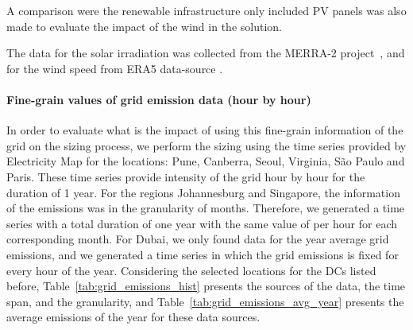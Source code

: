 A comparison were the renewable infrastructure only included PV panels was also made to evaluate the impact of the wind in the solution.

The data for the solar irradiation was collected from the MERRA-2 project~\cite{GELARO2017MERRA2}, and for the wind speed from ERA5 data-source \cite{era5_wind_2022}.

\paragraph{Fine-grain values of grid emission data (hour by hour)}


In order to evaluate what is the impact of using this fine-grain information of the grid  on the sizing process, we perform the sizing using the time series provided by Electricity Map for the locations: Pune, Canberra, Seoul, Virginia, São Paulo and Paris. These time series provide  intensity of the grid hour by hour for the duration of 1 year. For the regions Johannesburg and Singapore, the information of the  emissions was in the granularity of months. Therefore, we generated a time series with a total duration of one year with the same value of  per hour for each corresponding month. For Dubai, we only found data for the year average grid  emissions, and we generated a time series in which the grid emissions is fixed for every hour of the year. Considering the selected locations for the DCs listed before, Table~\ref{tab:grid_emissions_hist} presents the sources of the data, the time span, and the granularity, and Table~\ref{tab:grid_emissions_avg_year} presents the average  emissions of the year for these data sources.


